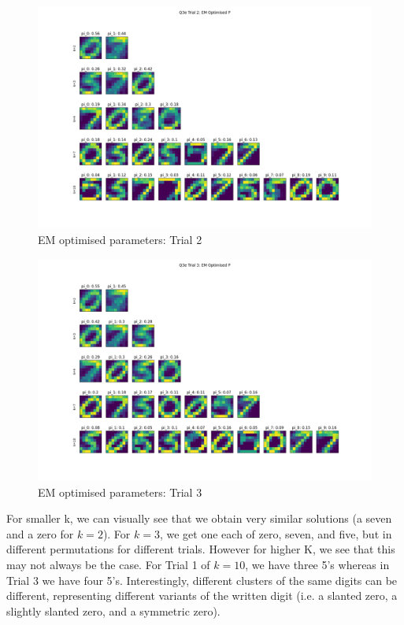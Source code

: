 \documentclass[12pt]{article}
\begin{document}
\begin{enumerate}
\begin{figure}[h]
  \centering
  \includegraphics[scale=0.3]{outputs/q3/q3e-2-optimised-p}
  \caption{EM optimised parameters: Trial 2}
  \label{fig:3e-initialised-p-trial-2}
\end{figure}
\begin{figure}[h]
  \centering
  \includegraphics[scale=0.3]{outputs/q3/q3e-3-optimised-p}
  \caption{EM optimised parameters: Trial 3}
  \label{fig:3e-initialised-p-trial-3}
\end{figure}


For smaller k, we can visually see that we obtain very similar solutions (a seven and a zero for $k=2$). For $k=3$, we get one each of zero, seven, and five, but in different permutations for different trials. However for higher K, we see that this may not always be the case. For Trial 1 of $k=10$, we have three 5's whereas in Trial 3 we have four 5's. Interestingly, different clusters of the same digits can be different, representing different variants of the written digit (i.e. a slanted zero, a slightly slanted zero, and a symmetric zero).


\end{enumerate}
\end{document}
